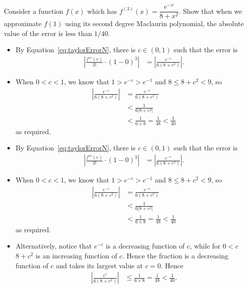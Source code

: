\begin{Mquestion}[2015Q]
Consider a function $f(x)$ which has $f^{(3)}(x)=\dfrac{e^{-x}}{8+x^2}$.  Show
that when we approximate $f(1)$ using its second degree Maclaurin polynomial, the
absolute value of the error is less than $1/40$.
\end{Mquestion}
\begin{answer}
\begin{itemize}
\item By Equation~\ref*{eq:taylorErrorN}, there is $c\in(0,1)$ such
that the error is
\begin{align*}
\left|\frac{f'''(c)}{3!}\cdot (1-0)^3\right|
&=  \left|\frac{e^{-c}}{6(8+c^2)}\right|.
\end{align*}

\item When $0< c<1$, we know that $1> e^{-c} > e^{-1}$ and
$8 \leq 8+c^2 < 9$, so
\begin{align*}
\left|\frac{e^{-c}}{6(8+c^2)}\right|
  &=\frac{e^{-c}}{6(8+c^2)} \\
  & < \frac{1}{6 |8+c^2|} \\
  & < \frac{1}{6\times 8} = \frac{1}{48} < \frac{1}{40}
\end{align*}
as required.
\end{itemize}
\end{answer}
\begin{solution}
\begin{itemize}
\item By Equation~\ref*{eq:taylorErrorN}, there is $c\in(0,1)$ such
that the error is
\begin{align*}
\left|\frac{f'''(c)}{3!}\cdot (1-0)^3\right|
&=  \left|\frac{e^{-c}}{6(8+c^2)}\right|.
\end{align*}

\item When $0< c<1$, we know that $1> e^{-c} > e^{-1}$ and
$8 \leq 8+c^2 < 9$, so
\begin{align*}
\left|\frac{e^{-c}}{6(8+c^2)}\right|
  &=\frac{e^{-c}}{6(8+c^2)} \\
  & < \frac{1}{6 |8+c^2|} \\
  & < \frac{1}{6\times 8} = \frac{1}{48} < \frac{1}{40}
\end{align*}
as required.

\item Alternatively, notice that $e^{-c}$ is a decreasing function of
$c$, while for $0<c$ $8+c^2$ is an increasing function of $c$. Hence the fraction is a
decreasing function of $c$ and takes its largest value at $c=0$. Hence
\begin{align*}
\left|\frac{e^c}{6(8+c^2)}\right|
& \leq \frac{1}{6\times 8} = \frac{1}{48} < \frac{1}{40}.
\end{align*}
\end{itemize}
\end{solution}



